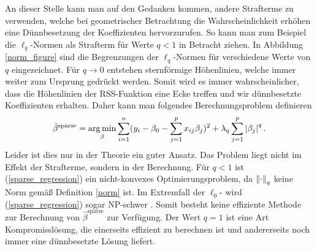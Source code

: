 An dieser Stelle kann man auf den Gedanken kommen, andere Strafterme zu verwenden, welche bei geometrischer Betrachtung die Wahrscheinlichkeit erhöhen eine Dünnbesetzung der Koeffizienten hervorzurufen. So kann man zum Beispiel die $\ell_q$-Normen als Strafterm für Werte $q < 1$ in Betracht ziehen. In Abbildung \ref{norm_figure} sind die Begrenzungen der $\ell_q$-Normen für verschiedene Werte von $q$ eingezeichnet. Für $q \rightarrow 0$ entstehen sternförmige Höhenlinien, welche immer weiter zum Ursprung gedrückt werden. Somit wird es immer wahrscheinlicher, dass die Höhenlinien der RSS-Funktion eine Ecke treffen und wir dünnbesetzte Koeffizienten erhalten. Daher kann man folgendes Berechnungsproblem definieren
\begin{align}
\label{sparse_regression}
\hat{\beta}^{\text{sparse}} = \operatorname*{arg\,min}_{\beta} \sum_{i=1}^{n}(y_i - \beta_0 - \sum_{j=1}^p x_{ij}\beta_j)^2 + \lambda_q\sum_{j=1}^p \left|\beta_j\right|^q.
\end{align}
Leider ist dies nur in der Theorie ein guter Ansatz. Das Problem liegt nicht im Effekt der Strafterme, sondern in der Berechnung. Für $q < 1$ ist (\ref{sparse_regression}) ein nicht-konvexes Optimierungsproblem, da $\left\lVert \cdot \right\rVert_q$ keine Norm gemäß Definition \ref{norm} ist. Im Extremfall der $\ell_0$- wird (\ref{sparse_regression}) sogar NP-schwer \cite{foucart}. Somit besteht keine effiziente Methode zur Berechnung von $\hat{\beta}^{\text{sparse}}$ zur Verfügung. Der Wert $q = 1$ ist eine Art Kompromisslösung, die einerseits effizient zu berechnen ist und andererseits noch immer eine dünnbesetzte Lösung liefert.

